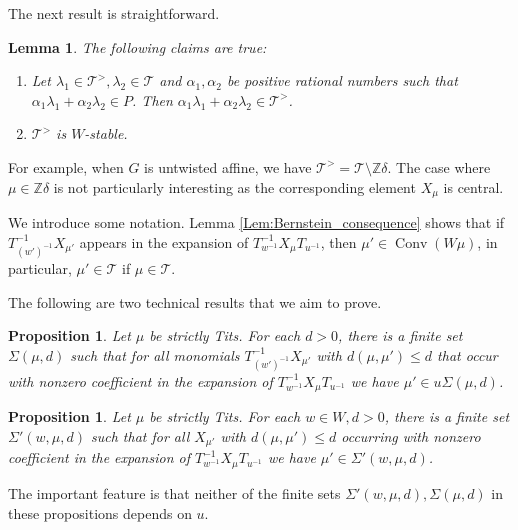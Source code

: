 \documentclass{amsart}
\newcommand{\Z}{\mathbb{Z}}
\newtheorem{Lem}[Thm]{Lemma}
\newtheorem{Prop}[Thm]{Proposition}
\theoremstyle{definition}
\numberwithin{equation}{section}
\begin{document}
The next result is straightforward.

\begin{Lem}\label{Lem:strictly_Tits_properties}
The following claims are true:
\begin{enumerate}
\item Let $\lambda_1\in \mathcal{T}^>, \lambda_2\in \mathcal{T}$ and $\alpha_1,\alpha_2$ be positive rational numbers such that $\alpha_1\lambda_1+\alpha_2\lambda_2\in P$. Then $\alpha_1\lambda_1+\alpha_2\lambda_2\in \mathcal{T}^>$.
\item $\mathcal{T}^>$ is $W$-stable.
\end{enumerate}
\end{Lem}


For example, when $G$ is untwisted affine, we have $\mathcal{T}^>=\mathcal{T}\setminus \mathbb{Z}\delta$. The case where $\mu\in \Z\delta$ is not particularly interesting as the corresponding element $X_\mu$ is central.

We introduce some notation. Lemma \ref{Lem:Bernstein_consequence} shows that if $T_{(w')^{-1}}^{-1}X_{\mu'}$ appears in the expansion of $T_{w^{-1}}^{-1}X_\mu T_{u^{-1}}$, then $\mu'\in \operatorname{Conv}(W\mu)$, in particular, $\mu'\in \mathcal{T}$ if $\mu\in \mathcal{T}$.



The following are two technical results that we aim to prove.

\begin{Prop}\label{Prop:weights_occuring1}
Let $\mu$ be strictly Tits.
For each $d>0$, there is a finite set $\Sigma(\mu,d)$ such that for all monomials $T_{(w')^{-1}}^{-1}X_{\mu'}$ with $d(\mu,\mu')\leqslant d$ that occur with nonzero coefficient in the expansion of $T_{w^{-1}}^{-1}X_\mu T_{u^{-1}}$ we have $\mu'\in u \Sigma(\mu,d)$.
\end{Prop}

\begin{Prop}\label{Prop:weights_occuring2}
Let $\mu$ be strictly Tits. For each $w\in W, d>0$,
there is a finite set $\Sigma'(w,\mu,d)$ such that for all $X_{\mu'}$ with $d(\mu, \mu') \leqslant d$ occurring with nonzero coefficient in the expansion of $T_{w^{-1}}^{-1} X_\mu T_{u^{-1}}$ we have $\mu'\in \Sigma'(w,\mu,d)$.
\end{Prop}

The important feature is that neither of the finite sets $\Sigma'(w,\mu,d),\Sigma(\mu,d)$ in these propositions depends on $u$.
\end{document}
